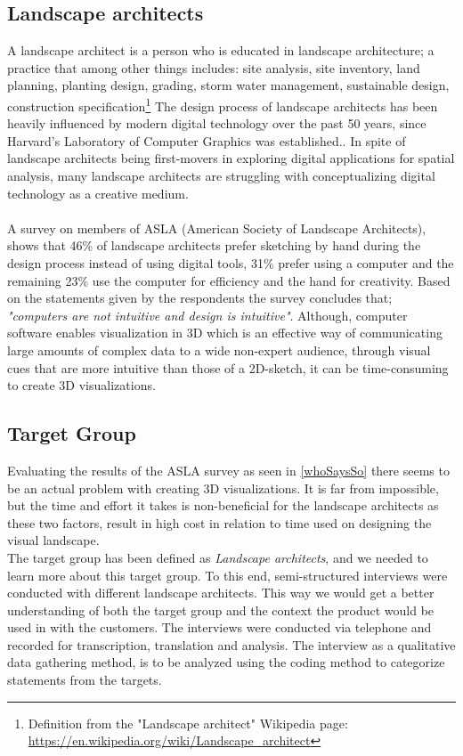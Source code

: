  	\subsection{Landscape architects}\label{whoSaysSo}
 	A landscape architect is a person who is educated in landscape architecture; a practice that among other things includes: site analysis, site inventory, land planning, planting design, grading, storm water management, sustainable design, construction specification\footnote{Definition from the "Landscape architect" Wikipedia page: \url{https://en.wikipedia.org/wiki/Landscape\_architect}}
 	The design process of landscape architects has been heavily influenced by modern digital technology over the past 50 years, since Harvard's Laboratory of Computer Graphics was established.\cite{landscapeArchitectureDigiTech}. In spite of landscape architects being first-movers in exploring digital applications for spatial analysis, many landscape architects are struggling with conceptualizing digital technology as a creative medium\cite{landscapeArchitectureDigiTech}. \\
 	\\
 	A survey on members of ASLA (American Society of Landscape Architects)\cite{surveySketchVSDigital}, shows that 46\% of landscape architects prefer sketching by hand during the design process instead of using digital tools, 31\% prefer using a computer and the remaining 23\% use the computer for efficiency and the hand for creativity. Based on the statements given by the respondents the survey concludes that; \textit{"computers are not intuitive and design is intuitive"}\cite{landscapeArchitectureDigiTech}\cite{surveySketchVSDigital}. Although, computer software enables visualization in 3D which is an effective way of communicating large amounts of complex data to a wide non-expert audience, through visual cues that are more intuitive than those of a 2D-sketch, it can be time-consuming to create 3D visualizations\cite{landscapeVisual}.
		
	\subsection{Target Group}\label{sec:targetGroup}
	Evaluating the results of the ASLA survey as seen in \autoref{whoSaysSo} there seems to be an actual problem with creating 3D visualizations. It is far from impossible, but the time and effort it takes is non-beneficial for the landscape architects as these two factors, result in high cost in relation to time used on designing the visual landscape. \\
	The target group has been defined as \textit{Landscape architects}, and we needed to learn more about this target group. To this end, semi-structured interviews were conducted with different landscape architects. This way we would get a better understanding of both the target group and the context the product would be used in with the customers. The interviews were conducted via telephone and recorded for transcription, translation and analysis. The interview as a qualitative data gathering method, is to be analyzed using the coding method to categorize statements from the targets.
	
